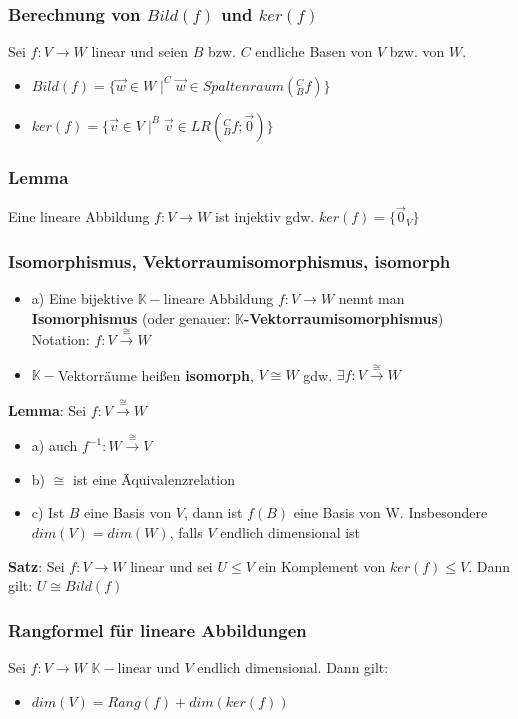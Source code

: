 \documentclass[titlepage]{article}
\newcommand{\K}{\mathbb{K}}
\newcommand{\1}{\mathbb{1}}
\newcommand{\0}{\mathbb{0}}
\begin{document}
				\subsubsection{Berechnung von $Bild(f)$ und $ker(f)$}
					Sei $f:V\rightarrow W$ linear und seien $B$ bzw. $C$ endliche Basen von $V$ bzw. von $W$.
					\begin{itemize}
						\item $Bild(f)=\{\vec{w}\in W\mid ^C\vec{w}\in Spaltenraum(^C_Bf)\}$
						\item $ker(f)=\{\vec{v}\in V\mid ^B\vec{v}\in LR(^C_Bf;\vec{0})\}$
					\end{itemize}
				\subsubsection{Lemma}
					Eine lineare Abbildung $f:V\rightarrow W$ ist injektiv gdw. $ker(f)=\{\vec{0}_V\}$
				\subsubsection{Isomorphismus, Vektorraumisomorphismus, isomorph}
					\begin{itemize}
						\item a) Eine bijektive $\K-$lineare Abbildung $f:V\rightarrow W$ nennt man \textbf{Isomorphismus} (oder genauer: $\K$\textbf{-Vektorraumisomorphismus})\\
						Notation: $f:V\overset{\cong}{\rightarrow} W$
						\item $\K-$Vektorräume heißen \textbf{isomorph}, $V\cong W$ gdw. $\exists f:V\overset{\cong}{\rightarrow} W$
					\end{itemize}
					\textbf{Lemma}: Sei $f:V\overset{\cong}{\rightarrow}W$\\
						\begin{itemize}
							\item a) auch $f^{-1}:W\overset{\cong}{\rightarrow}V$
							\item b) $\cong$ ist eine Äquivalenzrelation
							\item c) Ist $B$ eine Basis von $V$, dann ist $f(B)$ eine Basis von W. Insbesondere $dim(V)=dim(W)$, falls $V$ endlich dimensional ist
						\end{itemize}
					\textbf{Satz}: Sei $f:V\rightarrow W$ linear und sei $U\le V$ ein Komplement von $ker(f)\le V$. Dann gilt: $U\cong Bild(f)$
				\subsubsection{Rangformel für lineare Abbildungen}
					Sei $f:V\rightarrow W$ $\K-$linear und $V$ endlich dimensional. Dann gilt:
					\begin{itemize}
						\item $dim(V)=Rang(f)+dim(ker(f))$
					\end{itemize}
\end{document}
